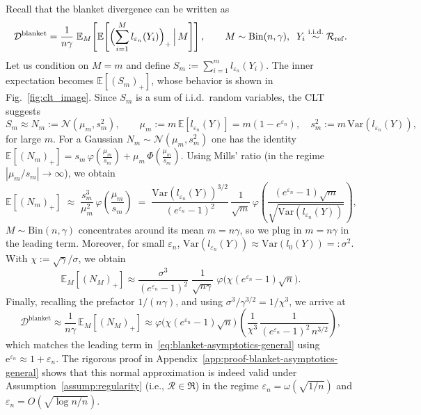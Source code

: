 \documentclass{article}
\theoremstyle{plain}
\theoremstyle{definition}
\begin{document}
Recall that the blanket divergence can be written as
\[
\mathcal D^{\mathrm{blanket}}
=
\frac{1}{n\gamma}\;
\mathbb E_{M}\!\left[
\mathbb E\!\left[\Bigl(\sum_{i=1}^{M} l_{\varepsilon_n}(Y_i)\Bigr)_+ \,\Big|\, M\right]
\right],
\qquad
M\sim\mathrm{Bin}(n,\gamma),\;\; Y_i\stackrel{\mathrm{i.i.d.}}{\sim}\mathcal R_{\mathrm{ref}}.
\]
Let us condition on $M=m$ and define
$
S_m := \sum_{i=1}^{m} l_{\varepsilon_n}(Y_i).
$
The inner expectation becomes $\mathbb E[(S_m)_+]$, whose behavior is shown in Fig.~\ref{fig:clt_image}.
Since $S_m$ is a sum of i.i.d.\ random variables, the CLT suggests
\[
S_m \approx N_m := \mathcal N(\mu_m,s_m^2),
\qquad
\mu_m := m\,\mathbb E[l_{\varepsilon_n}(Y)]=m(1-e^{\varepsilon_n}),
\quad
s_m^2 := m\,\mathrm{Var}(l_{\varepsilon_n}(Y)),
\]
for large $m$. For a Gaussian $N_m\sim\mathcal N(\mu_m,s^2_m)$ one has the identity
$
\mathbb E[(N_m)_+]
=
s_m\,\varphi\!\left(\frac{\mu_m}{s_m}\right)
+
\mu_m\,\Phi\!\left(\frac{\mu_m}{s_m}\right).
$
Using Mills' ratio (in the regime $|\mu_m/s_m|\to\infty$), we obtain
\[
\mathbb E[(N_m)_+]
\;\approx\;
\frac{s_m^3}{\mu_m^2}\,
\varphi\!\left(\frac{\mu_m}{s_m}\right)
\;=\;
\frac{\mathrm{Var}(l_{\varepsilon_n}(Y))^{3/2}}{(e^{\varepsilon_n}-1)^2}\,
\frac{1}{\sqrt m}\,
\varphi\!\left(
\frac{(e^{\varepsilon_n}-1)\sqrt m}{\sqrt{\mathrm{Var}(l_{\varepsilon_n}(Y))}}
\right),
\]
$M\sim\mathrm{Bin}(n,\gamma)$ concentrates around its mean $m=n\gamma$, so we plug in $m=n\gamma$ in the leading term. Moreover, for small $\varepsilon_n$, $\mathrm{Var}(l_{\varepsilon_n}(Y))\approx \mathrm{Var}(l_{0}(Y))=: \sigma^2$.
With $\chi:=\sqrt{\gamma}/\sigma$, we obtain
\[
\mathbb E_M[(N_{M})_+]
\approx
\frac{\sigma^3}{(e^{\varepsilon_n}-1)^2}\;
\frac{1}{\sqrt{n\gamma}}\;
\varphi\!\bigl(\chi(e^{\varepsilon_n}-1)\sqrt n\bigr).
\]
Finally, recalling the prefactor $1/(n\gamma)$, and using $\sigma^3/\gamma^{3/2}=1/\chi^3$, we arrive at
\[
\mathcal D^{\mathrm{blanket}}
\approx
\frac{1}{n\gamma}\,\mathbb E_M[(N_{M})_+]
\approx
\varphi\!\bigl(\chi(e^{\varepsilon_n}-1)\sqrt n\bigr)\,
\left(
\frac{1}{\chi^3}\,
\frac{1}{(e^{\varepsilon_n}-1)^2\,n^{3/2}}
\right),
\]
which matches the leading term in~\eqref{eq:blanket-asymptotics-general} using $\mathrm{e}^{\varepsilon_n}\approx 1+\varepsilon_n$.
The rigorous proof in Appendix~\ref{app:proof-blanket-asymptotics-general} shows that this normal
approximation is indeed valid under Assumption~\ref{assump:regularity} (i.e., $\mathcal{R}\in\mathfrak{R}$) in the regime $\varepsilon_n=\omega(\sqrt{1/n})$ and $\varepsilon_n=O(\sqrt{\log n/n})$.
\end{document}
